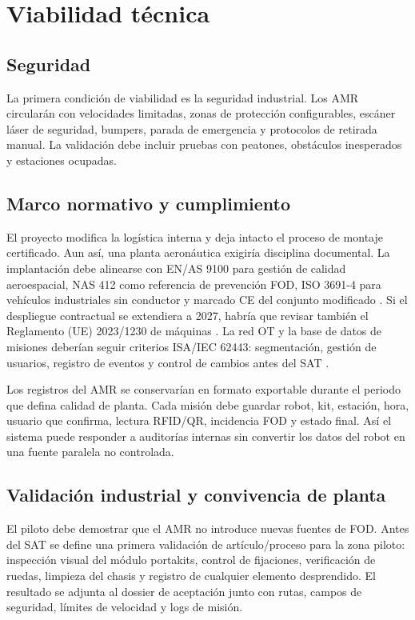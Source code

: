 \chapter{Viabilidad técnica}

\section{Seguridad}

La primera condición de viabilidad es la seguridad industrial. Los AMR circularán con velocidades limitadas, zonas de protección configurables, escáner láser de seguridad, bumpers, parada de emergencia y protocolos de retirada manual. La validación debe incluir pruebas con peatones, obstáculos inesperados y estaciones ocupadas.

\section{Marco normativo y cumplimiento}

El proyecto modifica la logística interna y deja intacto el proceso de montaje certificado. Aun así, una planta aeronáutica exigiría disciplina documental. La implantación debe alinearse con EN/AS 9100 para gestión de calidad aeroespacial, NAS 412 como referencia de prevención FOD, ISO 3691-4 para vehículos industriales sin conductor y marcado CE del conjunto modificado \cite{iaqg9100,nas412,iso36914}. Si el despliegue contractual se extendiera a 2027, habría que revisar también el Reglamento (UE) 2023/1230 de máquinas \cite{euMachineryReg2023}. La red OT y la base de datos de misiones deberían seguir criterios ISA/IEC 62443: segmentación, gestión de usuarios, registro de eventos y control de cambios antes del SAT \cite{iec62443}.

Los registros del AMR se conservarían en formato exportable durante el periodo que defina calidad de planta. Cada misión debe guardar robot, kit, estación, hora, usuario que confirma, lectura RFID/QR, incidencia FOD y estado final. Así el sistema puede responder a auditorías internas sin convertir los datos del robot en una fuente paralela no controlada.

\section{Validación industrial y convivencia de planta}

El piloto debe demostrar que el AMR no introduce nuevas fuentes de FOD. Antes del SAT se define una primera validación de artículo/proceso para la zona piloto: inspección visual del módulo portakits, control de fijaciones, verificación de ruedas, limpieza del chasis y registro de cualquier elemento desprendido. El resultado se adjunta al dossier de aceptación junto con rutas, campos de seguridad, límites de velocidad y logs de misión.

